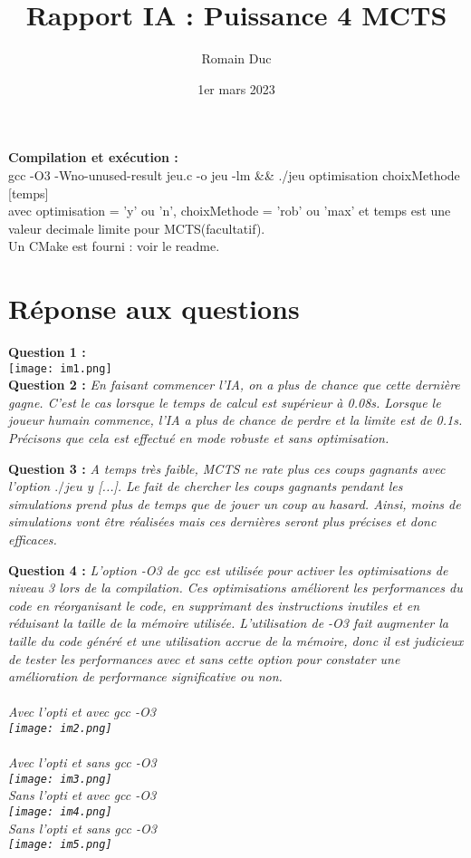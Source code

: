 \documentclass[a4paper,11pt]{article}
\title{Rapport IA : Puissance 4 MCTS}
\author{Romain Duc}
\date{1er mars 2023}
\begin{document}
    

    \maketitle
    \textbf{Compilation et exécution : } \\gcc -O3 -Wno-unused-result jeu.c -o jeu -lm \&\& ./jeu optimisation choixMethode [temps]\\ avec optimisation = 'y' ou 'n', choixMethode = 'rob' ou 'max' et temps est une valeur decimale limite pour MCTS(facultatif). \\Un CMake est fourni : voir le readme.
    
    
    

    \section{Réponse aux questions}
        \textbf{Question 1 : }\\\texttt{[image: im1.png]}\\

        \textbf{Question 2 : }\textit{En faisant commencer l'IA, on a plus de chance que cette dernière gagne. C'est le cas lorsque le temps de calcul est supérieur à 0.08s. Lorsque le joueur humain commence, l'IA a plus de chance de perdre et la limite est de 0.1s. Précisons que cela est effectué en mode robuste et sans optimisation.\\}
            
        \textbf{Question 3 : }\textit{A temps très faible, MCTS ne rate plus ces coups gagnants avec l'option $./jeu$ $y$ [...]. Le fait de chercher les coups gagnants pendant les simulations prend plus de temps que de jouer un coup au hasard. Ainsi, moins de simulations vont être réalisées mais ces dernières seront plus précises et donc efficaces.\\}

        \textbf{Question 4 : }\textit{L'option -O3 de gcc est utilisée pour activer les optimisations de niveau 3 lors de la compilation. Ces optimisations améliorent les performances du code en réorganisant le code, en supprimant des instructions inutiles et en réduisant la taille de la mémoire utilisée. L'utilisation de -O3 fait augmenter la taille du code généré et une utilisation accrue de la mémoire, donc il est judicieux de tester les performances avec et sans cette option pour constater une amélioration de performance significative ou non.\\\\Avec l'opti et avec gcc -O3\\\texttt{[image: im2.png]}\\\\Avec l'opti et sans gcc -O3\\\texttt{[image: im3.png]}\\Sans l'opti et avec gcc -O3\\\texttt{[image: im4.png]}\\Sans l'opti et sans gcc -O3\\\texttt{[image: im5.png]}\\	}	 
\end{document}
